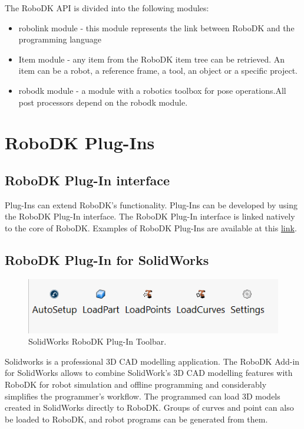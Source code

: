 The RoboDK API is divided into the following modules:


\begin{itemize}
    \item robolink module - this module represents the link between RoboDK and the programming language
    \item Item module - any item from the RoboDK item tree can be retrieved.  An item can be a robot, a reference frame, a tool, an object or a specific project.
    \item robodk module - a module with a robotics toolbox for pose operations.All post processors depend on the robodk module.
\end{itemize}

\section{RoboDK Plug-Ins}

\subsection{RoboDK Plug-In interface}

Plug-Ins can extend RoboDK's functionality. Plug-Ins can be developed by using the RoboDK Plug-In interface. The RoboDK Plug-In interface is linked natively to the core of RoboDK. Examples of RoboDK Plug-Ins are available at this \href{https://github.com/RoboDK/Plug-In-Interface}{link}. 

\subsection{RoboDK Plug-In for SolidWorks}

\begin{figure}[h]
    \centering
    \includegraphics[width=0.6\linewidth]{img/solidworks_toolbar.PNG}
    \caption{SolidWorks RoboDK Plug-In Toolbar.}
    \label{fig:solidworkstoolbar}
\end{figure}


Solidworks is a professional 3D CAD modelling application. The RoboDK Add-in for SolidWorks allows to combine SolidWork's 3D CAD modelling features with RoboDK for robot simulation and offline programming and considerably simplifies the programmer's workflow. The programmed can load 3D models created in SolidWorks directly to RoboDK. Groups of curves and point can also be loaded to RoboDK, and robot programs can be generated from them.

